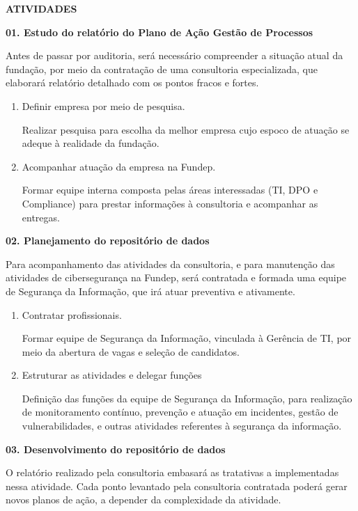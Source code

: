 \documentclass[12pt,a4paper]{article}
\newcommand{\secao}[1]{%
  \par\vspace{6pt}%
  {\noindent\bfseries\color{azulTitulo}\fontsize{13}{16}\selectfont #1}%
  \par\vspace{2pt}%
}
\newcommand{\atividade}[1]{%
  \par{\bfseries\color{azulAtividade}#1}\par
}
\begin{document}
\secao{ATIVIDADES}

\atividade{01. Estudo do relatório do Plano de Ação Gestão de Processos}

Antes de passar por auditoria, será necessário compreender a situação atual da fundação, por meio da contratação de uma consultoria especializada, que elaborará relatório detalhado com os pontos fracos e fortes.

\begin{enumerate}
  \item Definir empresa por meio de pesquisa.

        Realizar pesquisa para escolha da melhor empresa cujo espoco de atuação se adeque à realidade da fundação.
  \item Acompanhar atuação da empresa na Fundep.

        Formar equipe interna composta pelas áreas interessadas (TI, DPO e Compliance) para prestar informações à consultoria e acompanhar as entregas.
\end{enumerate}

\atividade{02. Planejamento do repositório de dados}

Para acompanhamento das atividades da consultoria, e para manutenção das atividades de cibersegurança na Fundep, será contratada e formada uma equipe de Segurança da Informação, que irá atuar preventiva e ativamente.

\begin{enumerate}
  \item Contratar profissionais.

        Formar equipe de Segurança da Informação, vinculada à Gerência de TI, por meio da abertura de vagas e seleção de candidatos.
  \item Estruturar as atividades e delegar funções

        Definição das funções da equipe de Segurança da Informação, para realização de monitoramento contínuo, prevenção e atuação em incidentes, gestão de vulnerabilidades, e outras atividades referentes à segurança da informação.
\end{enumerate}

\atividade{03. Desenvolvimento do repositório de dados}

O relatório realizado pela consultoria embasará as tratativas a implementadas nessa atividade. Cada ponto levantado pela consultoria contratada poderá gerar novos planos de ação, a depender da complexidade da atividade.
\end{document}
